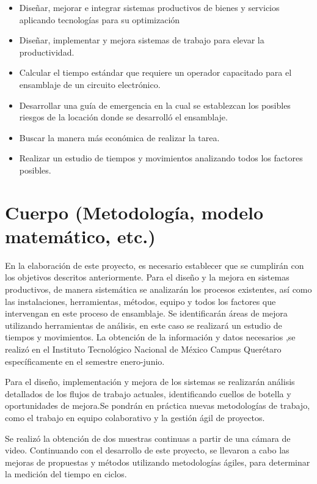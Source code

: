 \begin{itemize}
    \begin{itemize}
        \item Diseñar, mejorar e integrar sistemas productivos de bienes y servicios aplicando tecnologías para su optimización
        \item Diseñar, implementar y mejora sistemas de trabajo para elevar la productividad.
        \item Calcular el tiempo estándar que requiere un operador capacitado para el ensamblaje de un circuito electrónico.
        \item Desarrollar una guía de emergencia en la cual se establezcan los posibles riesgos de la locación donde se desarrolló el ensamblaje.
        \item Buscar la manera más económica de realizar la tarea.
        \item Realizar un estudio de tiempos y movimientos analizando todos los factores posibles.
    \end{itemize}
    
    
    \section{Cuerpo (Metodología, modelo matemático, etc.)}
    
    
    
    En la elaboración de este proyecto, es necesario establecer que se cumplirán con los objetivos descritos anteriormente. Para el diseño y la mejora en sistemas productivos, de manera sistemática se analizarán los procesos existentes, así como las instalaciones, herramientas, métodos, equipo y todos los factores que intervengan en este proceso de ensamblaje. Se identificarán áreas de mejora utilizando herramientas de análisis, en este caso se realizará un estudio de tiempos y movimientos. La obtención de la información y datos necesarios ,se realizó en el Instituto Tecnológico Nacional de México Campus Querétaro específicamente en el semestre enero-junio.
    
   Para el diseño, implementación y mejora de los sistemas se realizarán análisis detallados de los flujos de trabajo actuales, identificando cuellos de botella y oportunidades de mejora.Se pondrán en práctica nuevas metodologías de trabajo, como el trabajo en equipo colaborativo y la gestión ágil de proyectos.
   
    Se realizó la obtención de dos muestras continuas a partir de una cámara de video.  Continuando con el desarrollo de este proyecto, se llevaron a cabo las mejoras de propuestas y métodos utilizando metodologías ágiles, para determinar la medición del tiempo en ciclos.
    

\end{itemize}
